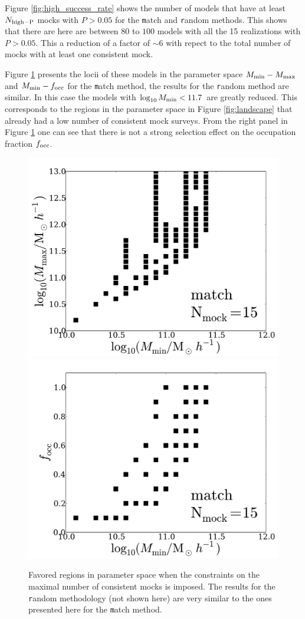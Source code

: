 \documentclass[usenatbib]{mn2e}
\begin{document}
Figure \ref{fig:high_success_rate} shows the number of models
that have at least $N_{\rm high-P}$ mocks with $P>0.05$ for the {\texttt
  match} and {\texttt random} methods.  This shows that there are
here are between $80$ to $100$ models with all the 15 realizations with
$P>0.05$. This a reduction of a factor of $\sim 6$ with repect to the
total number of mocks with at least one consistent mock. 

Figure \ref{fig:restriction_mock} presents the locii of these models
in the parameter space $M_{\rm min}-M_{\rm max}$ and $M_{\rm
  min}-f_{\rm occ}$ for the {\texttt match} method, the results for
the {\texttt random} method are similar. In this case the models with
$\log_{10}M_{\rm min}< 11.7$ are greatly reduced. This corresponds to
the regions in the parameter space in Figure \ref{fig:landscape} that
already had a low number of consistent mock surveys. From the right
panel in Figure \ref{fig:restriction_mock} one can see that there is
not a strong selection effect on the occupation fraction $f_{\rm
  occ}$. 



\begin{figure}
\begin{center}
\includegraphics[width=0.46\linewidth,angle=0]{./plots/Fig5_match_mass_mock.pdf}
\hspace{5mm}
\includegraphics[width=0.46\linewidth,angle=0]{./plots/Fig5_match_f_occ_mock.pdf}
\end{center} 
\caption{Favored regions in parameter space when the constraints on
  the maximal number of consistent mocks is imposed. The results for
  the {\texttt random} methodology (not shown here) are very similar to the ones
  presented here for the {\texttt match} method.
  \label{fig:restriction_mock}}  
\end{figure}
\end{document}
